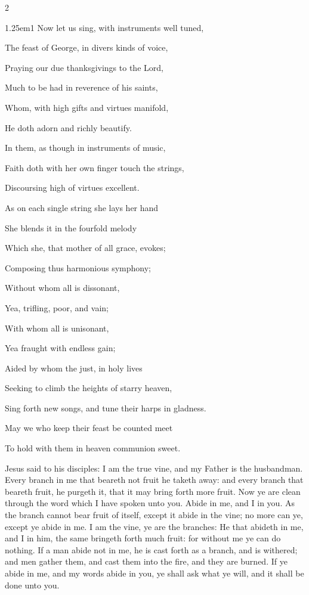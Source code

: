 \vspace{-0.5\baselineskip}

\begin{multicols}{2}
\begin{hangparas}{1.25em}{1}
Now let us sing, with instruments well tuned,

The feast of George, in divers kinds of voice,

Praying our due thanksgivings to the Lord,

Much to be had in reverence of his saints,

Whom, with high gifts and virtues manifold,

He doth adorn and richly beautify.

In them, as though in instruments of music,

Faith doth with her own finger touch the strings,

Discoursing high of virtues excellent.

As on each single string she lays her hand

She blends it in the fourfold melody

Which she, that mother of all grace, evokes;

Composing thus harmonious symphony;

Without whom all is dissonant,

Yea, trifling, poor, and vain;

With whom all is unisonant,

Yea fraught with endless gain;

Aided by whom the just, in holy lives

Seeking to climb the heights of starry heaven,

Sing forth new songs, and tune their harps in gladness.

May we who keep their feast be counted meet

To hold with them in heaven communion sweet.
\end{hangparas}
\end{multicols}

 Jesus said to his disciples: I am the true vine, and my Father is the husbandman. Every branch in me that beareth not fruit he taketh away: and every branch that beareth fruit, he purgeth it, that it may bring forth more fruit. Now ye are clean through the word which I have spoken unto you. Abide in me, and I in you. As the branch cannot bear fruit of itself, except it abide in the vine; no more can ye, except ye abide in me. I am the vine, ye are the branches: He that abideth in me, and I in him, the same bringeth forth much fruit: for without me ye can do nothing. If a man abide not in me, he is cast forth as a branch, and is withered; and men gather them, and cast them into the fire, and they are burned. If ye abide in me, and my words abide in you, ye shall ask what ye will, and it shall be done unto you.

